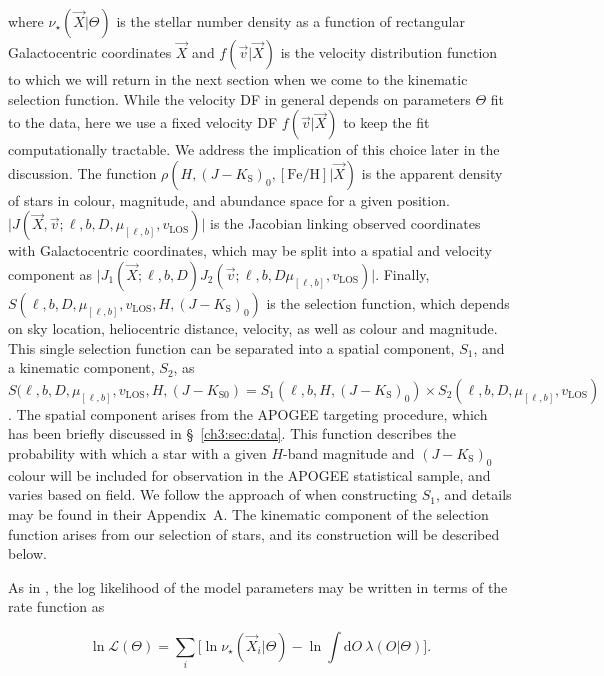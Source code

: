 \noindent where $\nu_{\star}(\vec{X} \vert \Theta)$ is the stellar number density as a function of rectangular Galactocentric coordinates $\vec{X}$ and $f(\vec{v} \vert \vec{X})$ is the velocity distribution function to which we will return in the next section when we come to the kinematic selection function. While the velocity DF in general depends on parameters $\Theta$ fit to the data, here we use a fixed velocity DF $f(\vec{v}\vert \vec{X})$ to keep the fit computationally tractable. We address the implication of this choice later in the discussion. The function $\rho(H, (J-K_\mathrm{S})_{0}, [\mathrm{Fe/H}] \vert \vec{X})$ is the apparent density of stars in colour, magnitude, and abundance space for a given position. $\vert J(\vec{X}, \vec{v}; \ell, b, D, \mu_{[\ell,b]}, v_\mathrm{LOS}) \vert$ is the Jacobian linking observed coordinates with Galactocentric coordinates, which may be split into a spatial and velocity component as $\vert J_{1}(\vec{X}; \ell, b, D) J_{2}( \vec{v}; \ell, b, D \mu_{[\ell,b]}, v_\mathrm{LOS}) \vert$. Finally, $S(\ell, b, D, \mu_{[\ell,b]}, v_\mathrm{LOS}, H, (J-K_\mathrm{S})_{0})$ is the selection function, which depends on sky location, heliocentric distance, velocity, as well as colour and magnitude. This single selection function can be separated into a spatial component, $S_{1}$, and a kinematic component, $S_{2}$, as $S(\ell, b, D, \mu_{[\ell,b]}, v_\mathrm{LOS}, H, (J-K_{\mathrm{S}0}) = S_{1}(\ell, b, H, (J-K_\mathrm{S})_{0}) \times S_{2}(\ell, b, D, \mu_{[\ell,b]}, v_\mathrm{LOS})$. The spatial component arises from the APOGEE targeting procedure, which has been briefly discussed in \S~\ref{ch3:sec:data}. This function describes the probability with which a star with a given $H$-band magnitude and $(J-K_\mathrm{S})_{0}$ colour will be included for observation in the APOGEE statistical sample, and varies based on field. We follow the approach of \cite{mackereth20} when constructing $S_{1}$, and details may be found in their Appendix~A. The kinematic component of the selection function arises from our selection of \gse stars, and its construction will be described below.

As in \textcite{bovy12d}, the log likelihood of the model parameters may be written in terms of the rate function as

\begin{equation}
\label{ch3:eq:log-likelihood}
	\ln \mathcal{L}(\Theta) = \sum_{i} \big[ \ln \nu_{\star}(\vec{X}_{i} \vert \Theta) - \ln \int \mathrm{d}O\ \lambda(O \vert \Theta) \big].
\end{equation}

